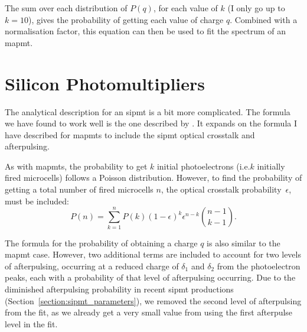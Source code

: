 The sum over each distribution of $P(q)$, for each value of $k$ (I only go up to $k=10$), gives the probability of getting each value of charge $q$. Combined with a normalisation factor, this equation can then be used to fit the spectrum of an \gls{mapmt}.

\section{Silicon Photomultipliers}

The analytical description for an \gls{sipmt} is a bit more complicated. The formula we have found to work well is the one described by \textcite{Gentile2010}. It expands on the formula I have described for \glspl{mapmt} to include the \gls{sipmt} optical crosstalk and afterpulsing.

As with \glspl{mapmt}, the probability to get $k$ initial photoelectrons (i.e.\@ $k$ initially fired microcells) follows a Poisson distribution. However, to find the probability of getting a total number of fired microcells $n$, the optical crosstalk probability~$\epsilon$, must be included:
\begin{equation}
P(n) = \sum_{k=1}^n P(k) (1 - \epsilon)^k \epsilon^{n-k} \binom{n-1}{k-1}.
\end{equation}

The formula for the probability of obtaining a charge $q$ is also similar to the \gls{mapmt} case. However, two additional terms are included to account for two levels of afterpulsing, occurring at a reduced charge of $\delta_1$ and $\delta_2$ from the photoelectron peaks, each with a probability of that level of afterpulsing occurring. Due to the diminished afterpulsing probability in recent \gls{sipmt} productions (Section~\ref{section:sipmt_parameters}), we removed the second level of afterpulsing from the fit, as we already get a very small value from using the first afterpulse level in the fit.
